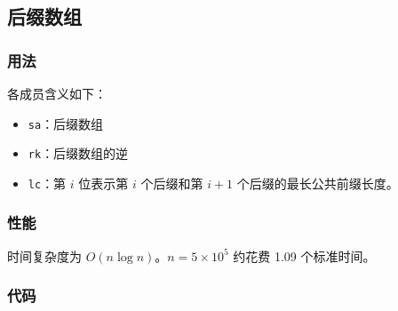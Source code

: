 \subsection{后缀数组}

\subsubsection{用法}

各成员含义如下：

\begin{itemize}
\item \lstinline{sa}：后缀数组
\item \lstinline{rk}：后缀数组的逆
\item \lstinline{lc}：第 $i$ 位表示第 $i$ 个后缀和第 $i + 1$ 个后缀的最长公共前缀长度。
\end{itemize}

\subsubsection{性能}

时间复杂度为 $O(n \log n)$。$n = 5 \times 10^5$ 约花费 1.09 个标准时间。

\subsubsection{代码}


